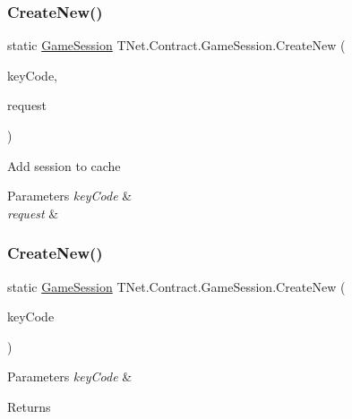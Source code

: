 \subsubsection{\texorpdfstring{Create\+New()}{CreateNew()}\hspace{0.1cm}{\footnotesize\ttfamily [2/4]}}
{\footnotesize\ttfamily static \mbox{\hyperlink{class_t_net_1_1_contract_1_1_game_session}{Game\+Session}} T\+Net.\+Contract.\+Game\+Session.\+Create\+New (\begin{DoxyParamCaption}\item[{Guid}]{key\+Code,  }\item[{Http\+Listener\+Request}]{request }\end{DoxyParamCaption})\hspace{0.3cm}{\ttfamily [static]}}



Add session to cache 


\begin{DoxyParams}{Parameters}
{\em key\+Code} & \\
\hline
{\em request} & \\
\hline
\end{DoxyParams}
\mbox{\label{class_t_net_1_1_contract_1_1_game_session_a6142a8d48d3693d3dfb7f43d6cddb8e9}} 
\subsubsection{\texorpdfstring{Create\+New()}{CreateNew()}\hspace{0.1cm}{\footnotesize\ttfamily [3/4]}}
{\footnotesize\ttfamily static \mbox{\hyperlink{class_t_net_1_1_contract_1_1_game_session}{Game\+Session}} T\+Net.\+Contract.\+Game\+Session.\+Create\+New (\begin{DoxyParamCaption}\item[{Guid}]{key\+Code }\end{DoxyParamCaption})\hspace{0.3cm}{\ttfamily [static]}}






\begin{DoxyParams}{Parameters}
{\em key\+Code} & \\
\hline
\end{DoxyParams}
\begin{DoxyReturn}{Returns}

\end{DoxyReturn}
\mbox{\label{class_t_net_1_1_contract_1_1_game_session_a9dd16391327609b53ff9e154919e9aba}} 
